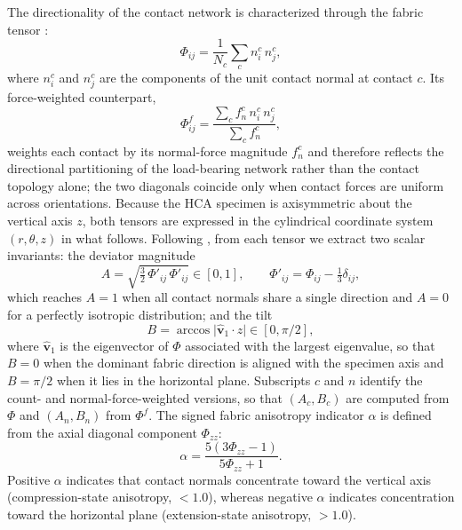 The directionality of the contact network is characterized through the fabric tensor \citep{Oda1982fabric,Oda1982stat}:
\begin{equation}
\Phi_{ij} = \frac{1}{N_c}\sum_c n_i^c\,n_j^c,
\label{eq:fabric_tensor}
\end{equation}
where $n_i^c$ and $n_j^c$ are the components of the unit contact normal at contact $c$. Its force-weighted counterpart,
\begin{equation}
\Phi^f_{ij} = \frac{\sum_c f_n^c\, n_i^c\, n_j^c}{\sum_c f_n^c},
\label{eq:fabric_tensor_force}
\end{equation}
weights each contact by its normal-force magnitude $f_n^c$ and therefore reflects the directional partitioning of the load-bearing network rather than the contact topology alone; the two diagonals coincide only when contact forces are uniform across orientations. Because the HCA specimen is axisymmetric about the vertical axis $z$, both tensors are expressed in the cylindrical coordinate system $(r,\theta,z)$ in what follows. Following \citet{Zhou2022,Song2024}, from each tensor we extract two scalar invariants: the deviator magnitude
\begin{equation}
A = \sqrt{\tfrac{3}{2}\,\Phi'_{ij}\,\Phi'_{ij}} \in [0,1],
\qquad
\Phi'_{ij} = \Phi_{ij} - \tfrac{1}{3}\delta_{ij},
\label{eq:fabric_invariants}
\end{equation}
which reaches $A = 1$ when all contact normals share a single direction and $A = 0$ for a perfectly isotropic distribution; and the tilt
\begin{equation}
B = \arccos\bigl|\hat{\bm v}_1 \cdot \hat{z}\bigr| \in [0, \pi/2],
\label{eq:fabric_tilt}
\end{equation}
where $\hat{\bm v}_1$ is the eigenvector of $\Phi$ associated with the largest eigenvalue, so that $B = 0$ when the dominant fabric direction is aligned with the specimen axis and $B = \pi/2$ when it lies in the horizontal plane. Subscripts $c$ and $n$ identify the count- and normal-force-weighted versions, so that $(A_c, B_c)$ are computed from $\Phi$ and $(A_n, B_n)$ from $\Phi^f$. The signed fabric anisotropy indicator $\alpha$ \citep{YimsiriSoga2010,Otsubo2022} is defined from the axial diagonal component $\Phi_{zz}$:
\begin{equation}
\alpha = \frac{5(3\Phi_{zz} - 1)}{5\Phi_{zz} + 1}.
\label{eq:alpha_definition_method}
\end{equation}
Positive $\alpha$ indicates that contact normals concentrate toward the vertical axis (compression-state anisotropy, \Kzero{} $< 1.0$), whereas negative $\alpha$ indicates concentration toward the horizontal plane (extension-state anisotropy, \Kzero{} $> 1.0$).

